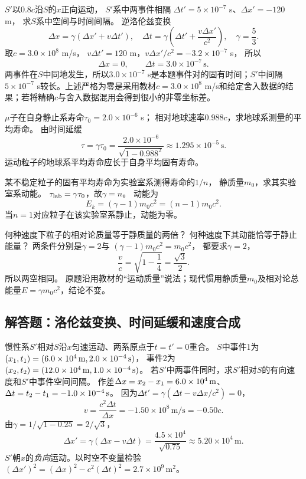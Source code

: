 \problemtext $S'$以$0.8c$沿$S$的$x$正向运动，
$S'$系中两事件相隔
$\Delta t'=5\times10^{-7}$ s、$\Delta x'=-120$ m，
求$S$系中空间与时间间隔。
\workings
逆洛伦兹变换
\[
\Delta x=\gamma(\Delta x'+v\Delta t'),
\quad
\Delta t=\gamma\left(\Delta t'+\frac{v\Delta x'}{c^2}\right),
\quad\gamma=\frac53.
\]
取$c=3.0\times10^8$ m/s，
$v\Delta t'=120$ m，$v\Delta x'/c^2=-3.2\times10^{-7}$ s，
所以
\[
\boxed{\Delta x=0},\qquad
\boxed{\Delta t=3.0\times10^{-7}\,\mathrm s}.
\]
\crosscheck 两事件在$S$中同地发生，所以$3.0\times10^{-7}$ s是本题事件对的固有时间；$S'$中间隔$5\times10^{-7}$ s较长。上述严格为零是采用教材$c=3.0\times10^8$ m/s和给定舍入数据的结果；若将精确$c$与舍入数据混用会得到很小的非零坐标差。

\problemtext $\mu$子在自身静止系寿命$\tau_0=2.0\times10^{-6}$ s；
相对地球速率$0.988c$，求地球系测量的平均寿命。
\workings
由时间延缓
\[
\boxed{\tau=\gamma\tau_0
=\frac{2.0\times10^{-6}}{\sqrt{1-0.988^2}}
\approx1.295\times10^{-5}\,\mathrm s}.
\]
\crosscheck 运动粒子的地球系平均寿命应长于自身平均固有寿命。

\problemtext 某不稳定粒子的固有平均寿命为实验室系测得寿命的$1/n$，
静质量$m_0$，求其实验室系动能。
\workings
$\tau_{\rm lab}=\gamma\tau_0$，故$\gamma=n$。
动能为
\[
\boxed{E_k=(\gamma-1)m_0c^2=(n-1)m_0c^2}.
\]
\crosscheck 当$n=1$对应粒子在该实验室系静止，动能为零。

\problemtext 何种速度下粒子的相对论质量等于静质量的两倍？
何种速度下其动能恰等于静止能量？
\workings
两条件分别是$\gamma=2$与
$(\gamma-1)m_0c^2=m_0c^2$，
都要求$\gamma=2$，
\[
\boxed{\frac vc=\sqrt{1-\frac14}=\frac{\sqrt3}{2}}.
\]
所以两空相同。
\crosscheck 原题沿用教材的“运动质量”说法；现代惯用静质量$m_0$及相对论总能量$E=\gamma m_0c^2$，结论不变。

\subsection{解答题：洛伦兹变换、时间延缓和速度合成}

\problemtext 惯性系$S'$相对$S$沿$x$匀速运动、两系原点于$t=t'=0$重合。
$S$中事件1为$(x_1,t_1)=(6.0\times10^4\rm\,m,2.0\times10^{-4}\rm\,s)$，
事件2为$(x_2,t_2)=(12.0\times10^4\rm\,m,1.0\times10^{-4}\rm\,s)$。
若$S'$中两事件同时，求$S'$相对$S$的有向速度和$S'$中事件空间间隔。
\workings
作差$\Delta x=x_2-x_1=6.0\times10^4\rm\,m$、
$\Delta t=t_2-t_1=-1.0\times10^{-4}\rm\,s$。
因为$\Delta t'=\gamma(\Delta t-v\Delta x/c^2)=0$，
\[
\boxed{v=\frac{c^2\Delta t}{\Delta x}=-1.50\times10^8\,\mathrm{m/s}=-0.50c}.
\]
由$\gamma=1/\sqrt{1-0.25}=2/\sqrt3$，
\[
\boxed{\Delta x'=\gamma(\Delta x-v\Delta t)
=\frac{4.5\times10^4}{\sqrt{0.75}}
\approx5.20\times10^4\,\mathrm m}.
\]
\crosscheck $S'$朝$x$的\emph{负向}运动。以时空不变量检验
$(\Delta x')^2=(\Delta x)^2-c^2(\Delta t)^2
=2.7\times10^9\,\mathrm{m^2}$。

